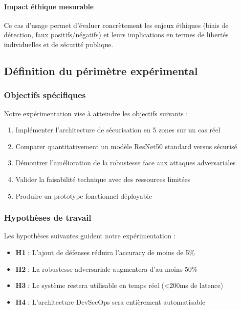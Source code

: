 \paragraph{Impact éthique mesurable}
Ce cas d'usage permet d'évaluer concrètement les enjeux éthiques (biais de détection, faux positifs/négatifs) et leurs implications en termes de libertés individuelles et de sécurité publique.

\subsection{Définition du périmètre expérimental}

\subsubsection{Objectifs spécifiques}

Notre expérimentation vise à atteindre les objectifs suivants :

\begin{enumerate}
    \item Implémenter l'architecture de sécurisation en 5 zones sur un cas réel
    \item Comparer quantitativement un modèle ResNet50 standard versus sécurisé
    \item Démontrer l'amélioration de la robustesse face aux attaques adversariales
    \item Valider la faisabilité technique avec des ressources limitées
    \item Produire un prototype fonctionnel déployable
\end{enumerate}

\subsubsection{Hypothèses de travail}

Les hypothèses suivantes guident notre expérimentation :

\begin{itemize}
    \item \textbf{H1} : L'ajout de défenses réduira l'accuracy de moins de 5\%
    \item \textbf{H2} : La robustesse adversariale augmentera d'au moins 50\%
    \item \textbf{H3} : Le système restera utilisable en temps réel (<200ms de latence)
    \item \textbf{H4} : L'architecture DevSecOps sera entièrement automatisable
\end{itemize}


